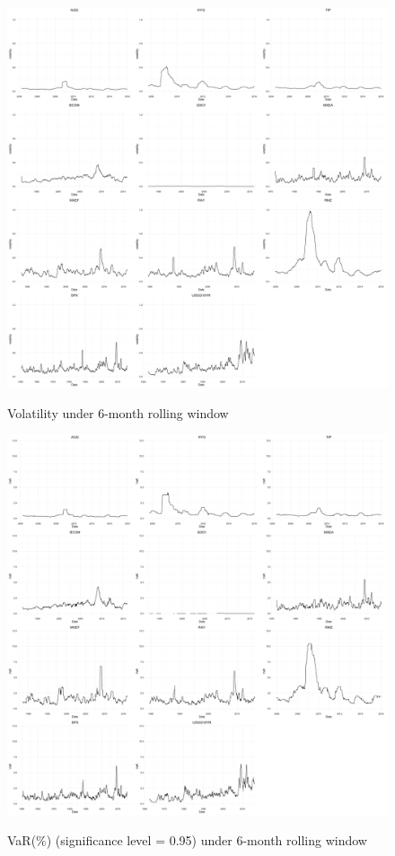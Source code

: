 \documentclass[12pt]{article}
\begin{document}
\begin{figure}[h]
\caption{Volatility under 6-month rolling window} 
\centering 
\includegraphics[width=15cm]{../figures/rolling_stats/volatility6mon_scaled}
\label{fig: variance6mon}
\end{figure}

\begin{figure}[h]
\caption{VaR(\%) (significance level = 0.95) under 6-month rolling window}
\centering 
\includegraphics[width=15cm]{../figures/rolling_stats/VaR6mon_scaled}
\label{fig: VaR6mon}
\end{figure}
\end{document}
